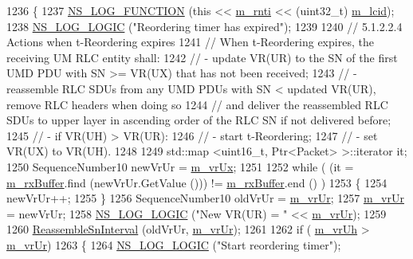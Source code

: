\begin{DoxyCode}
1236 \{
1237   \hyperlink{log-macros-disabled_8h_a90b90d5bad1f39cb1b64923ea94c0761}{NS\_LOG\_FUNCTION} (\textcolor{keyword}{this} << \hyperlink{classns3_1_1LteRlc_a48ab0a78e7f2687337075b1c8832df70}{m\_rnti} << (uint32\_t) \hyperlink{classns3_1_1LteRlc_a051085e9b27883e7ba4b98ad7242fd8a}{m\_lcid});
1238   \hyperlink{group__logging_ga88acd260151caf2db9c0fc84997f45ce}{NS\_LOG\_LOGIC} (\textcolor{stringliteral}{"Reordering timer has expired"});
1239 
1240   \textcolor{comment}{// 5.1.2.2.4 Actions when t-Reordering expires}
1241   \textcolor{comment}{// When t-Reordering expires, the receiving UM RLC entity shall:}
1242   \textcolor{comment}{// - update VR(UR) to the SN of the first UMD PDU with SN >= VR(UX) that has not been received;}
1243   \textcolor{comment}{// - reassemble RLC SDUs from any UMD PDUs with SN < updated VR(UR), remove RLC headers when doing so}
1244   \textcolor{comment}{//   and deliver the reassembled RLC SDUs to upper layer in ascending order of the RLC SN if not
       delivered before;}
1245   \textcolor{comment}{// - if VR(UH) > VR(UR):}
1246   \textcolor{comment}{//    - start t-Reordering;}
1247   \textcolor{comment}{//    - set VR(UX) to VR(UH).}
1248 
1249   std::map <uint16\_t, Ptr<Packet> >::iterator it;
1250   SequenceNumber10 newVrUr = \hyperlink{classns3_1_1LteRlcUmLowLat_a59217fd77422401b9cd0788a363e395c}{m\_vrUx};
1251 
1252   \textcolor{keywordflow}{while} ( (it = \hyperlink{classns3_1_1LteRlcUmLowLat_aedc712a69598a77115ae9a67133b53d8}{m\_rxBuffer}.find (newVrUr.GetValue ())) != \hyperlink{classns3_1_1LteRlcUmLowLat_aedc712a69598a77115ae9a67133b53d8}{m\_rxBuffer}.end () )
1253     \{
1254       newVrUr++;
1255     \}
1256   SequenceNumber10 oldVrUr = \hyperlink{classns3_1_1LteRlcUmLowLat_a614417e6259a873e3d2dbde0d67a1df6}{m\_vrUr};
1257   \hyperlink{classns3_1_1LteRlcUmLowLat_a614417e6259a873e3d2dbde0d67a1df6}{m\_vrUr} = newVrUr;
1258   \hyperlink{group__logging_ga88acd260151caf2db9c0fc84997f45ce}{NS\_LOG\_LOGIC} (\textcolor{stringliteral}{"New VR(UR) = "} << \hyperlink{classns3_1_1LteRlcUmLowLat_a614417e6259a873e3d2dbde0d67a1df6}{m\_vrUr});
1259 
1260   \hyperlink{classns3_1_1LteRlcUmLowLat_aef0c71efceb98b3dd6c5bdbfc773ee0d}{ReassembleSnInterval} (oldVrUr, \hyperlink{classns3_1_1LteRlcUmLowLat_a614417e6259a873e3d2dbde0d67a1df6}{m\_vrUr});
1261 
1262   \textcolor{keywordflow}{if} ( \hyperlink{classns3_1_1LteRlcUmLowLat_aa5ff652a885ef59bdda2446f6abd3cd8}{m\_vrUh} > \hyperlink{classns3_1_1LteRlcUmLowLat_a614417e6259a873e3d2dbde0d67a1df6}{m\_vrUr})
1263     \{
1264       \hyperlink{group__logging_ga88acd260151caf2db9c0fc84997f45ce}{NS\_LOG\_LOGIC} (\textcolor{stringliteral}{"Start reordering timer"});

\end{DoxyCode}

